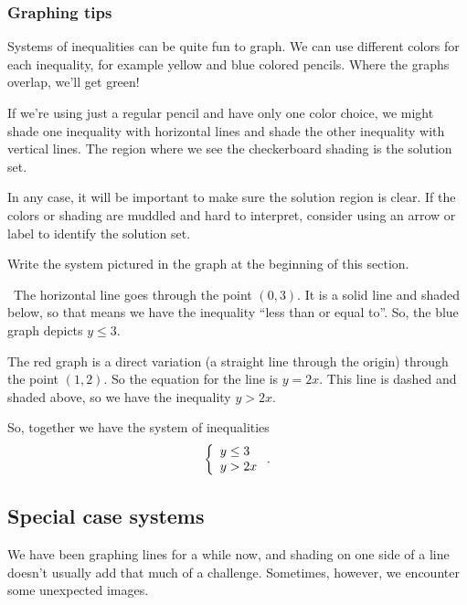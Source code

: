 \subsubsection{Graphing tips}

Systems of inequalities can be quite fun to graph. We can use different colors for each inequality, for example yellow and blue colored pencils. Where the graphs overlap, we'll get green!

If we're using just a regular pencil and have only one color choice, we might shade one inequality with horizontal lines and shade the other inequality with vertical lines. The region where we see the checkerboard shading is the solution set.

In any case, it will be important to make sure the solution region is clear. If the colors or shading are muddled and hard to interpret, consider using an arrow or label to identify the solution set.

\begin{boxedex}
Write the system pictured in the graph at the beginning of this section.

\exsoln\ The horizontal line goes through the point $(0,3)$. It is a solid line and shaded below, so that means we have the inequality ``less than or equal to''. So, the blue graph depicts $y \leq 3$.

The red graph is a direct variation (a straight line through the origin) through the point $(1,2)$. So the equation for the line is $y=2x$. This line is dashed and shaded above, so we have the inequality $y > 2x$.

So, together we have the system of inequalities \[\left\{\begin{array}{l}y\leq3\\y>2x\end{array}\right..\]
\end{boxedex}

\subsection{Special case systems}

We have been graphing lines for a while now, and shading on one side of a line doesn't usually add that much of a challenge. Sometimes, however, we encounter some unexpected images.


